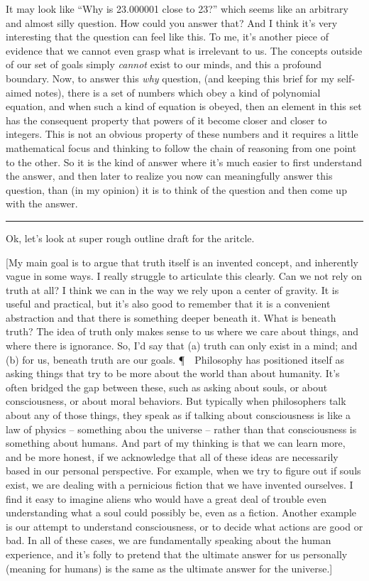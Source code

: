 \documentclass[11pt, oneside]{article}   	%
\begin{document}
\begin{itemize}
        It may look like ``Why is 23.000001 close to 23?'' which seems like an
        arbitrary and almost silly question. How could you answer that? And I
        think it's very interesting that the question can feel like this. To me,
        it's another piece of evidence that we cannot even grasp what is
        irrelevant to us. The concepts outside of our set of goals simply {\em
        cannot} exist to our minds, and this a profound boundary. Now, to answer
        this {\em why} question, (and keeping this brief for my self-aimed
        notes), there is a set of numbers which obey a kind of polynomial
        equation, and when such a kind of equation is obeyed, then an element in
        this set has the consequent property that powers of it become closer and
        closer to integers. This is not an obvious property of these numbers and
        it requires a little mathematical focus and thinking to follow the chain
        of reasoning from one point to the other. So it is the kind of answer
        where it's much easier to first understand the answer, and then later to
        realize you now can meaningfully answer this question, than (in my
        opinion) it is to think of the question and then come up with the
        answer.
\end{itemize}

\bigskip
\hrule
\bigskip

Ok, let's look at super rough outline draft for the aritcle.

[My main goal is to argue that truth itself is an invented concept, and
inherently vague in some ways. I really struggle to articulate this clearly. Can
we not rely on truth at all? I think we can in the way we rely upon a center of
gravity. It is useful and practical, but it's also good to remember that it is a
convenient abstraction and that there is something deeper beneath it. What is
beneath truth? The idea of truth only makes sense to us where we care about
things, and where there is ignorance. So, I'd say that (a) truth can only exist
in a mind; and (b) for us, beneath truth are our goals. \P\ \ Philosophy has
positioned itself as asking things that try to be more about the world than
about humanity. It's often bridged the gap between these, such as asking about
souls, or about consciousness, or about moral behaviors. But typically
when philosophers talk about any of those things, they speak as if talking about
consciousness is like a law of physics -- something abou the universe -- rather
than that consciousness is something about humans. And part of my thinking is
that we can learn more, and be more honest, if we acknowledge that all of these
ideas are necessarily based in our personal perspective. For example, when we
try to figure out if souls exist, we are dealing with a pernicious fiction that
we have invented ourselves. I find it easy to imagine aliens who would have a
great deal of trouble even understanding what a soul could possibly be, even as
a fiction. Another example is our attempt to understand consciousness, or to
decide what actions are good or bad. In all of these cases, we are fundamentally
speaking about the human experience, and it's folly to pretend that the ultimate
answer for us personally (meaning for humans) is the same as the ultimate answer
for the universe.]
\end{document}
